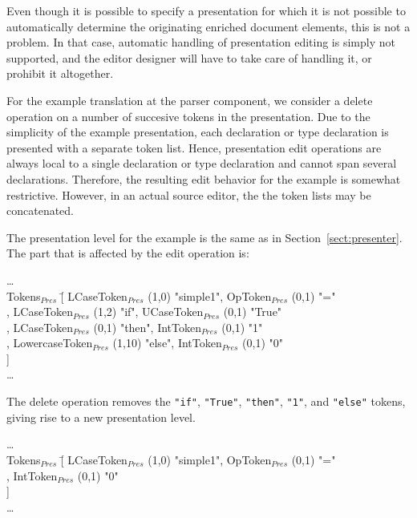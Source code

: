 Even though it is possible to specify a presentation for which it is not possible to automatically determine the originating enriched document elements, this is not a problem. In that case, automatic handling of presentation editing is simply not supported, and the editor designer will have to take care of handling it, or prohibit it altogether. 

For the example translation at the parser component, we consider a delete operation on a number of succesive tokens in the presentation. Due to the simplicity of the example presentation, each declaration or type declaration is presented with a separate token list. Hence, presentation edit operations are always local to a single declaration or type declaration and cannot span several declarations. Therefore, the resulting edit behavior for the example is somewhat restrictive. However, in an actual source editor, the the token lists may be concatenated.

The presentation level for the example is the same as in Section~\ref{sect:presenter}. The part that is affected by the edit operation is: 

\small \ttfamily
\begin{tabbing}
\dots\\
Tokens$_{Pres}$ \= [ LCaseToken$_{Pres}$ (1,0) "simple1", OpToken$_{Pres}$ (0,1) "="\\
                         \> , LCaseToken$_{Pres}$ (1,2) "if", UCaseToken$_{Pres}$ (0,1) "True"\\
                         \> , LCaseToken$_{Pres}$ (0,1) "then", IntToken$_{Pres}$ (0,1) "1"\\
                         \> , LowercaseToken$_{Pres}$ (1,10) "else", IntToken$_{Pres}$ (0,1) "0"\\
                         \> ]\\
\dots                                                  
\end{tabbing}
\rmfamily \normalsize

The delete operation removes the \verb|"if"|,  \verb|"True"|,  \verb|"then"|,  \verb|"1"|, and  \verb|"else"| tokens, giving rise to a new presentation level.

\small \ttfamily
\begin{tabbing}
\dots\\
Tokens$_{Pres}$ \= [ LCaseToken$_{Pres}$ (1,0) "simple1", OpToken$_{Pres}$ (0,1) "="\\
                         \> ,  IntToken$_{Pres}$ (0,1) "0"\\
                         \> ]\\
\dots                                                  
\end{tabbing}
\rmfamily \normalsize

